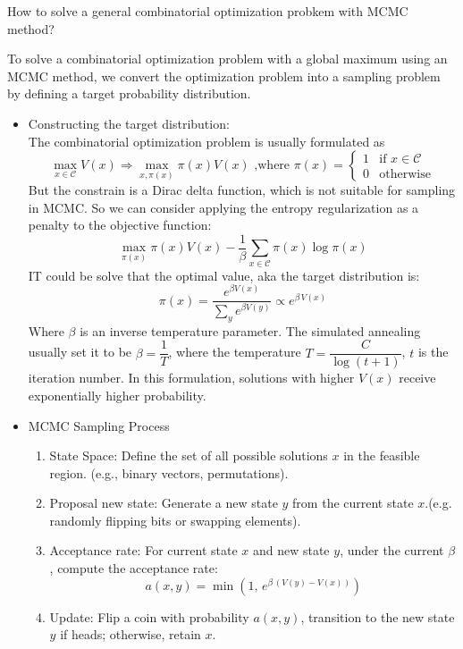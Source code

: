 \begin{homeworkProblem}

How to solve a general combinatorial optimization probkem with MCMC method?

\solution

To solve a combinatorial optimization problem with a global maximum using an MCMC method, we convert the optimization problem into a sampling problem by defining a target probability distribution.

\begin{itemize}
\item Constructing the target distribution: \\
The combinatorial optimization problem is usually formulated as
$$\max_{x\in\mathcal{C}}  V(x)\Rightarrow \max_{x,\pi(x)} \pi(x)V(x) \text{ ,where } \pi(x) = \begin{cases}
1 & \text{if } x \in \mathcal{C
} \\
0 & \text{otherwise}
\end{cases}$$
But the constrain is a Dirac delta function, which is not suitable for sampling in MCMC. So we can consider applying the entropy regularization as a penalty to the objective function:
$$\max_{\pi(x)} \pi(x)V(x) - \dfrac{1}{\beta}\sum_{x\in\mathcal{C}}\pi(x)\log\pi(x)$$
IT could be solve that the optimal value, aka the target distribution is:
$$\pi(x) = \dfrac{e^{\beta V(x)}}{\sum\limits_{y}e^{\beta V(y)}} \propto e^{\beta\,V(x)}$$
Where $\beta$ is an inverse temperature parameter. The simulated annealing usually set it to be $\beta=\dfrac{1}{T}$, where the temperature $T=\dfrac{C}{\log(t+1)}$, $t$ is the iteration number. In this formulation, solutions with higher $V(x)$ receive exponentially higher probability.

\item MCMC Sampling Process
\begin{enumerate}
\item State Space: Define the set of all possible solutions $x$ in the feasible region. (e.g., binary vectors, permutations).
\item Proposal new state: Generate a new state $y$ from the current state $x$.(e.g. randomly flipping bits or swapping elements).
\item Acceptance rate: For current state $x$ and new state $y$, under the current $\beta$, compute the acceptance rate:
$$a(x,y) = \min\left(1,\, e^{\beta\,(V(y)-V(x))}\right)$$
\item Update: Flip a coin with probability $a(x,y)$, transition to the new state $y$ if heads; otherwise, retain $x$.
\end{enumerate}
\end{itemize}


\end{homeworkProblem}
